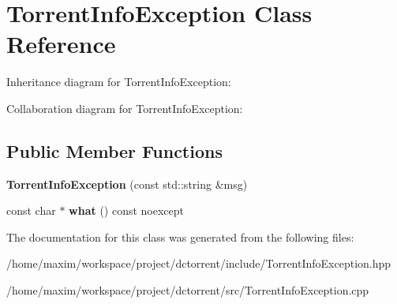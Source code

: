 \hypertarget{class_torrent_info_exception}{}\section{Torrent\+Info\+Exception Class Reference}
\label{class_torrent_info_exception}


Inheritance diagram for Torrent\+Info\+Exception\+:


Collaboration diagram for Torrent\+Info\+Exception\+:
\subsection*{Public Member Functions}
\begin{DoxyCompactItemize}
\item 
\mbox{\label{class_torrent_info_exception_a06a3037ffb2b25fcef314213b1e40cf6}} 
{\bfseries Torrent\+Info\+Exception} (const std\+::string \&msg)
\item 
\mbox{\label{class_torrent_info_exception_a706588e0fbed005799b8b149abd21091}} 
const char $\ast$ {\bfseries what} () const noexcept
\end{DoxyCompactItemize}


The documentation for this class was generated from the following files\+:\begin{DoxyCompactItemize}
\item 
/home/maxim/workspace/project/dctorrent/include/Torrent\+Info\+Exception.\+hpp\item 
/home/maxim/workspace/project/dctorrent/src/Torrent\+Info\+Exception.\+cpp\end{DoxyCompactItemize}

